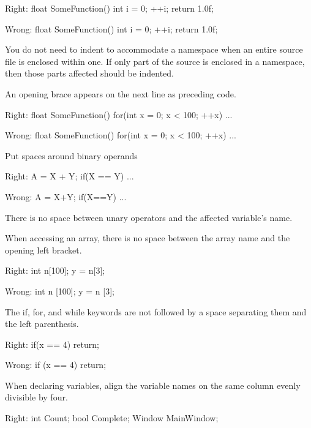 Right:
\startCodeExample
float SomeFunction()
{
    int i = 0;
  ++i;
    return 1.0f;
}
\stopCodeExample

Wrong:
\startCodeExample
float SomeFunction()
{
    int i = 0;
    ++i;
        return 1.0f;
}
\stopCodeExample

\item
You do not need to indent to accommodate a namespace when an entire source file is enclosed within one. If only part of the source is enclosed in a namespace, then those parts affected should be indented.

\item
An opening brace appears on the next line as preceding code.

Right:
\startCodeExample
float SomeFunction()
{
    for(int x = 0; x < 100; ++x)
    {
        ...
    }
}
\stopCodeExample

Wrong:
\startCodeExample
float SomeFunction() {
    for(int x = 0; x < 100; ++x) {
        ...
    }
}
\stopCodeExample

\item
Put spaces around binary operands

Right:
\startCodeExample
A = X + Y;
if(X == Y)
    ...
\stopCodeExample

Wrong:
\startCodeExample
A = X+Y;
if(X==Y)
    ...
\stopCodeExample

\item
There is no space between unary operators and the affected variable's name.

\item
When accessing an array, there is no space between the array name and the opening left bracket. 

Right:
\startCodeExample
int n[100];
y = n[3];
\stopCodeExample

Wrong:
\startCodeExample
int n [100];
y = n [3];
\stopCodeExample

\item
The if, for, and while keywords are not followed by a space separating them and the left parenthesis. 

Right:
\startCodeExample
if(x == 4)
    return;
\stopCodeExample

Wrong:
\startCodeExample
if (x == 4)
    return;
\stopCodeExample

\item
When declaring variables, align the variable names on the same column evenly divisible by four.

Right:
\startCodeExample
int     Count;
bool    Complete;
Window  MainWindow;
\stopCodeExample

